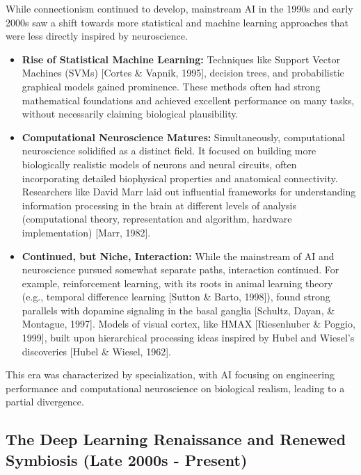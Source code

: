 \documentclass[11pt,a4paper]{article}
\begin{document}
While connectionism continued to develop, mainstream AI in the 1990s and early 2000s saw a shift towards more statistical and machine learning approaches that were less directly inspired by neuroscience.
\begin{itemize}
    \item \textbf{Rise of Statistical Machine Learning:} Techniques like Support Vector Machines (SVMs) [Cortes \& Vapnik, 1995], decision trees, and probabilistic graphical models gained prominence. These methods often had strong mathematical foundations and achieved excellent performance on many tasks, without necessarily claiming biological plausibility.
    \item \textbf{Computational Neuroscience Matures:} Simultaneously, computational neuroscience solidified as a distinct field. It focused on building more biologically realistic models of neurons and neural circuits, often incorporating detailed biophysical properties and anatomical connectivity. Researchers like David Marr laid out influential frameworks for understanding information processing in the brain at different levels of analysis (computational theory, representation and algorithm, hardware implementation) [Marr, 1982].
    \item \textbf{Continued, but Niche, Interaction:} While the mainstream of AI and neuroscience pursued somewhat separate paths, interaction continued. For example, reinforcement learning, with its roots in animal learning theory (e.g., temporal difference learning [Sutton \& Barto, 1998]), found strong parallels with dopamine signaling in the basal ganglia [Schultz, Dayan, \& Montague, 1997]. Models of visual cortex, like HMAX [Riesenhuber \& Poggio, 1999], built upon hierarchical processing ideas inspired by Hubel and Wiesel's discoveries [Hubel \& Wiesel, 1962].
\end{itemize}
This era was characterized by specialization, with AI focusing on engineering performance and computational neuroscience on biological realism, leading to a partial divergence.

\subsection{The Deep Learning Renaissance and Renewed Symbiosis (Late 2000s - Present)}
\end{document}
